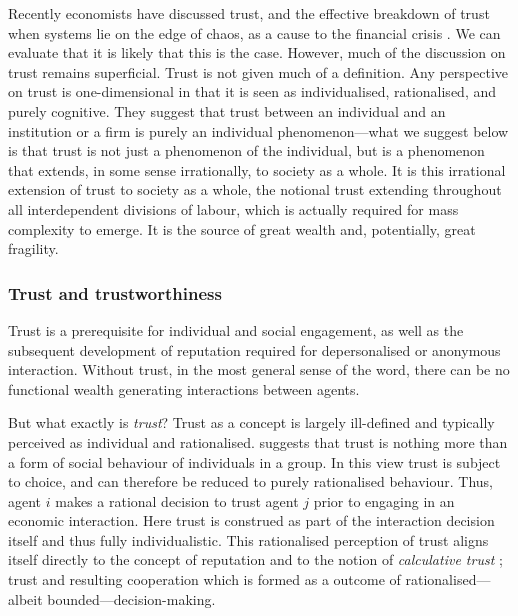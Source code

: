 \begin{subappendices}
Recently economists have discussed trust, and the effective breakdown of trust when systems lie on the edge of chaos, as a cause to the financial crisis \citep{Shiller2008, Tonkiss2009}. We can evaluate that it is likely that this is the case. However, much of the discussion on trust remains superficial. Trust is not given much of a definition. Any perspective on trust is one-dimensional in that it is seen as individualised, rationalised, and purely cognitive. They suggest that trust between an individual and an institution or a firm is purely an individual phenomenon---what we suggest below is that trust is not just a phenomenon of the individual, but is a phenomenon that extends, in some sense irrationally, to society as a whole. It is this irrational extension of trust to society as a whole, the notional trust extending throughout all interdependent divisions of labour, which is actually required for mass complexity to emerge. It is the source of great wealth and, potentially, great fragility.

\subsubsection{Trust and trustworthiness}

Trust is a prerequisite for individual and social engagement, as well as the subsequent development of reputation required for depersonalised or anonymous interaction. Without trust, in the most general sense of the word, there can be no functional wealth generating interactions between agents. 

But what exactly is \emph{trust}? Trust as a concept is largely ill-defined and typically perceived as individual and rationalised. \citet{Coleman1990} suggests that trust is nothing more than a form of social behaviour of individuals in a group. In this view trust is subject to choice, and can therefore be reduced to purely rationalised behaviour. Thus, agent $i$ makes a rational decision to trust agent $j$ prior to engaging in an economic interaction. Here trust is construed as part of the interaction decision itself and thus fully individualistic. This rationalised perception of trust aligns itself directly to the concept of reputation and to the notion of \textit{calculative trust} \citep{Williamson1993}; trust and resulting cooperation which is formed as a outcome of rationalised---albeit bounded---decision-making.


\end{subappendices}
